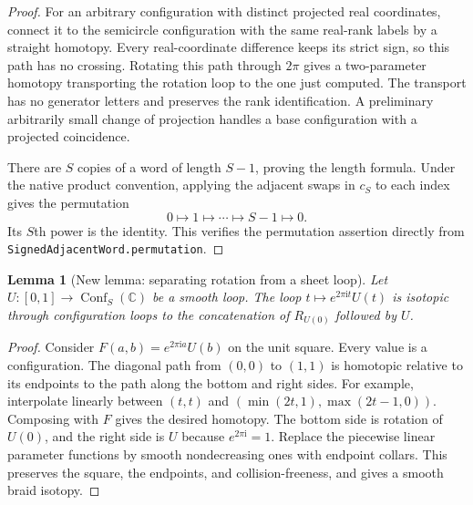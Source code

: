 \documentclass[11pt,oneside]{report}
\newtheorem{lemma}[theorem]{Lemma}
\theoremstyle{definition}
\numberwithin{equation}{section}
\newcommand{\C}{\mathbb C}
\newcommand{\decl}[1]{\textnormal{\nolinkurl{#1}}}
\newcommand{\ii}{\mathrm i}
\newcommand{\Conf}{\operatorname{Conf}}
\begin{document}
\begin{proof}
For an arbitrary configuration with distinct projected real coordinates,
connect it to the semicircle configuration with the same real-rank labels
by a straight homotopy. Every real-coordinate difference keeps its strict
sign, so this path has no crossing. Rotating this path through $2\pi$
gives a two-parameter homotopy transporting the rotation loop to the one
just computed. The transport has no generator letters and preserves the
rank identification. A preliminary arbitrarily small change of projection
handles a base configuration with a projected coincidence.

There are $S$ copies of a word of length $S-1$, proving the length formula.
Under the native product convention, applying the adjacent swaps in $c_S$
to each index gives the permutation
\[
 0\mapsto1\mapsto\cdots\mapsto S-1\mapsto0.
\]
Its $S$th power is the identity. This verifies the
permutation assertion directly from \decl{SignedAdjacentWord.permutation}.
\end{proof}

\begin{lemma}[New lemma: separating rotation from a sheet loop]
\label{J14:lem:product}
Let $U:[0,1]\to\Conf_S(\C)$ be a smooth loop. The loop
$t\mapsto e^{2\pi\ii t}U(t)$ is isotopic through configuration loops to the
concatenation of $R_{U(0)}$ followed by $U$.
\end{lemma}
\begin{proof}
Consider $F(a,b)=e^{2\pi\ii a}U(b)$ on the unit square.
Every value is a configuration. The diagonal path from $(0,0)$ to $(1,1)$
is homotopic relative to its endpoints to the path along the bottom and
right sides. For example, interpolate linearly between
$(t,t)$ and
$(\min(2t,1),\max(2t-1,0))$.
Composing with $F$ gives the desired homotopy. The bottom side is rotation
of $U(0)$, and the right side is $U$ because $e^{2\pi\ii}=1$.
Replace the piecewise linear parameter functions by smooth nondecreasing
ones with endpoint collars. This preserves the square, the endpoints, and
collision-freeness, and gives a smooth braid isotopy.
\end{proof}
\end{document}
